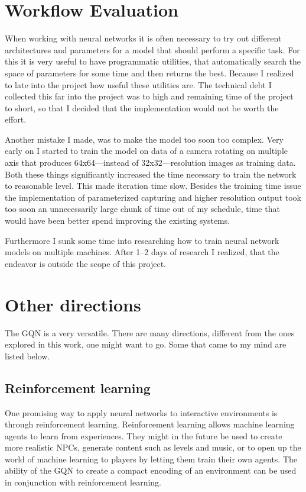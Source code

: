 \section{Workflow Evaluation}
When working with neural networks it is often necessary to try out different architectures and parameters for a model that should perform a specific task. For this it is very useful to have programmatic utilities, that automatically search the space of parameters for some time and then returns the best. Because I realized to late into the project how useful these utilities are. The technical debt I collected this far into the project was to high and remaining time of the project to short, so that I decided that the implementation would not be worth the effort.

Another mistake I made, was to make the model too soon too complex. Very early on I started to train the model on data of a camera rotating on multiple axis that produces 64x64---instead of 32x32---resolution images as training data. Both these things significantly increased the time necessary to train the network to reasonable level. This made iteration time slow. Besides the training time issue the implementation of parameterized capturing and higher resolution output took too soon an unnecessarily large chunk of time out of my schedule, time that would have been better spend improving the existing systems.

Furthermore I sunk some time into researching how to train neural network models on multiple machines. After 1--2 days of research I realized, that the endeavor is outside the scope of this project.

\section{Other directions}
The GQN is a very versatile. There are many directions, different from the ones explored in this work, one might want to go. Some that came to my mind are listed below.

\subsection{Reinforcement learning}
One promising way to apply neural networks to interactive environments is through reinforcement learning. Reinforcement learning allows machine learning agents to learn from experiences. They might in the future be used to create more realistic NPCs, generate content such as levels and music, or to open up the world of machine learning to players by letting them train their own agents. The ability of the GQN to create a compact encoding of an environment can be used in conjunction with reinforcement learning.

